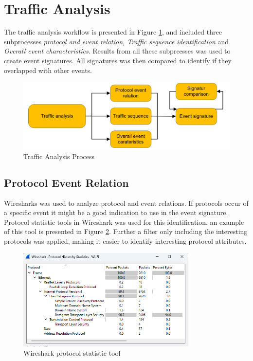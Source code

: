 \section{Traffic Analysis}
The traffic analysis workflow is presented in Figure \ref{fig:TrafficAnalysisProcess}, and included three subprocesses \textit{protocol and event relation, Traffic sequence identification} and \textit{Overall event characteristics}. Results from all these subprcesses was used to create event signatures. All signatures was then compared to identify if they overlapped with other events. 

\begin{figure}[H]
    \centering
    \includegraphics[width=\textwidth]{figures/TrafficAnalysisProcess.png}
    \caption{Traffic Analysis Process}
    \label{fig:TrafficAnalysisProcess}
\end{figure}

\subsection{Protocol Event Relation}
Wiresharks was used to analyze protocol and event relations. If protocols occur of a specific event it might be a good indication to use in the event signature. Protocol statistic tools in Wireshark was used for this identification, an example of this tool is presented in Figure \ref{fig:wiresharkprotocolstatistictools}. Further a filter only including the interesting protocols was applied, making it easier to identify interesting  protocol attributes.

\begin{figure}[H]
    \centering
    \includegraphics[width=0.8\textwidth]{figures/wireshark_protocol_hirarcy.png}
    \caption{Wireshark protocol statistic tool}
    \label{fig:wiresharkprotocolstatistictools}
\end{figure}

